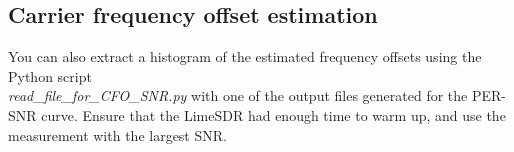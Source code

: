 \subsection{Carrier frequency offset estimation}
You can also extract a histogram of the estimated frequency offsets using the Python script \\ \emph{read\_file\_for\_CFO\_SNR.py} with one of the output files generated for the PER-SNR curve. Ensure that the LimeSDR had enough time to warm up, and use the measurement with the largest SNR.



\newpage
\begin{comment}
\appendix
\section{Questions}
\subsection{Packet error rate}
Obtain the packet error rate curves as a function of the SNR using the simulation framework. Compare the PER-SNR curve obtained assuming perfect synchronization with the one using all synchronization algorithms. Identify and comment the differences, highlighting their origins with relevant graphs and explanations. Determine the bottleneck in the communication chain. Furthermore, compare these simulated curves with the PER-SNR curve obtained in practice, superimposed on the simulation results. Explain and motivate the differences.

\subsection{Carrier frequency offset estimation}
Discuss the Moose algorithm, based on simulation results and practical measurements. Give and motivate a method to choose the length $N$ of the blocks used by Moose.

Regarding the measurements, obtain a histogram of the carrier frequency offset. What is the shape of the histogram and how can it be linked to $N$?

\subsection{SNR-distance measurements}
Another important aspect of your communication chain is the communication distance that can be achieved. Previously, you identified the required SNR to ensure a desired BER or PER. The next step is therefore to determine the variations of the SNR with the communication distance.


\end{comment}
